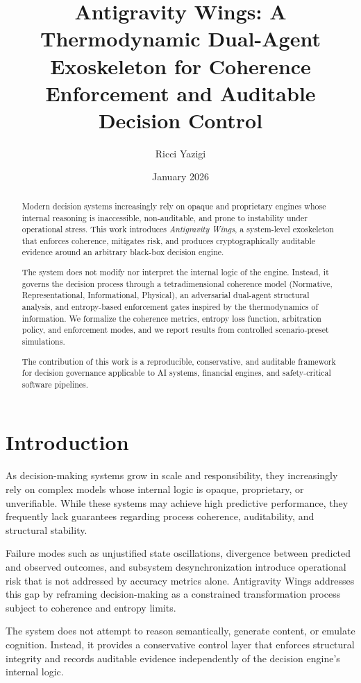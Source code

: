 \documentclass[11pt]{article}
\title{Antigravity Wings: A Thermodynamic Dual-Agent Exoskeleton for Coherence Enforcement and Auditable Decision Control}
\author[1]{Ricci Yazigi}
\affil[1]{Independent Research}
\date{January 2026}
\begin{document}
\maketitle

\begin{abstract}
Modern decision systems increasingly rely on opaque and proprietary engines whose internal reasoning is inaccessible, non-auditable, and prone to instability under operational stress. This work introduces \textit{Antigravity Wings}, a system-level exoskeleton that enforces coherence, mitigates risk, and produces cryptographically auditable evidence around an arbitrary black-box decision engine.

The system does not modify nor interpret the internal logic of the engine. Instead, it governs the decision process through a tetradimensional coherence model (Normative, Representational, Informational, Physical), an adversarial dual-agent structural analysis, and entropy-based enforcement gates inspired by the thermodynamics of information. We formalize the coherence metrics, entropy loss function, arbitration policy, and enforcement modes, and we report results from controlled scenario-preset simulations.

The contribution of this work is a reproducible, conservative, and auditable framework for decision governance applicable to AI systems, financial engines, and safety-critical software pipelines.
\end{abstract}

\section{Introduction}

As decision-making systems grow in scale and responsibility, they increasingly rely on complex models whose internal logic is opaque, proprietary, or unverifiable. While these systems may achieve high predictive performance, they frequently lack guarantees regarding process coherence, auditability, and structural stability.

Failure modes such as unjustified state oscillations, divergence between predicted and observed outcomes, and subsystem desynchronization introduce operational risk that is not addressed by accuracy metrics alone. Antigravity Wings addresses this gap by reframing decision-making as a constrained transformation process subject to coherence and entropy limits.

The system does not attempt to reason semantically, generate content, or emulate cognition. Instead, it provides a conservative control layer that enforces structural integrity and records auditable evidence independently of the decision engine's internal logic.
\end{document}
